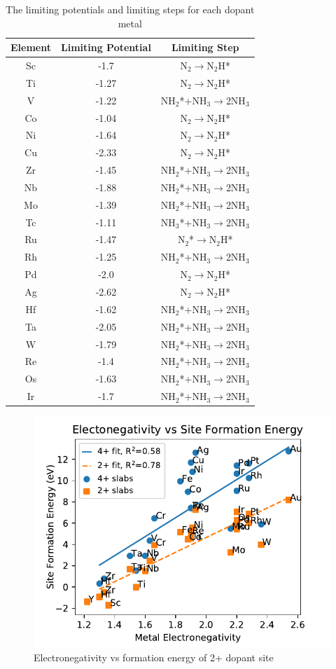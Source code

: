 \begin{table}
\begin{center}
\begin{tabular}{| c | c |c |}
\hline
Element & Limiting Potential & Limiting Step \\
\hline
Sc & -1.7 & N$_2$$\rightarrow$N$_2$H*\\
Ti & -1.27 & N$_2$$\rightarrow$N$_2$H*\\
V & -1.22 & NH$_2$*+NH$_3$$\rightarrow$2NH$_3$\\
Co & -1.04 & N$_2$$\rightarrow$N$_2$H*\\
Ni & -1.64 & N$_2$$\rightarrow$N$_2$H*\\
Cu & -2.33 & N$_2$$\rightarrow$N$_2$H*\\
Zr & -1.45 & NH$_2$*+NH$_3$$\rightarrow$2NH$_3$\\
Nb & -1.88 & NH$_2$*+NH$_3$$\rightarrow$2NH$_3$\\
Mo & -1.39 & NH$_2$*+NH$_3$$\rightarrow$2NH$_3$\\
Tc & -1.11 & NH$_3$*+NH$_3$$\rightarrow$2NH$_3$\\
Ru & -1.47 & N$_2$*$\rightarrow$N$_2$H*\\
Rh & -1.25 & NH$_2$*+NH$_3$$\rightarrow$2NH$_3$\\
Pd & -2.0 & N$_2$$\rightarrow$N$_2$H*\\
Ag & -2.62 & N$_2$$\rightarrow$N$_2$H*\\
Hf & -1.62 & NH$_2$*+NH$_3$$\rightarrow$2NH$_3$\\
Ta & -2.05 & NH$_2$*+NH$_3$$\rightarrow$2NH$_3$\\
W & -1.79 & NH$_2$*+NH$_3$$\rightarrow$2NH$_3$\\
Re & -1.4 & NH$_2$*+NH$_3$$\rightarrow$2NH$_3$\\
Os & -1.63 & NH$_2$*+NH$_3$$\rightarrow$2NH$_3$\\
Ir & -1.7 & NH$_2$*+NH$_3$$\rightarrow$2NH$_3$\\
\hline
\end{tabular}
\end{center}
\caption{The limiting potentials and limiting steps for each dopant metal}\label{table:limiting_steps}\end{table}\begin{figure}
\centering
\includegraphics[width=0.8\linewidth]{Images/electronegativity_vs_formation.pdf}
\caption{Electronegativity vs formation energy of 2+ dopant site}
\end{figure}

